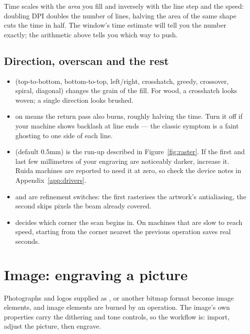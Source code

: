 \noindent Time scales with the \emph{area} you fill and inversely with the line
step and the speed: doubling DPI doubles the number of lines, halving the area of
the same shape cuts the time in half. The  window's time
estimate will tell you the number exactly; the arithmetic above tells you which
way to push.

\subsection*{Direction, overscan and the rest}

\begin{itemize}
  \item {} (top-to-bottom, bottom-to-top, left/right, crosshatch,
        greedy, crossover, spiral, diagonal) changes the grain of the fill. For
        wood, a crosshatch looks woven; a single direction looks brushed.
  \item {} on means the return pass also burns, roughly
        halving the time. Turn it off if your machine shows backlash at line ends
        --- the classic symptom is a faint ghosting to one side of each line.
  \item {} (default 0.5\unit{mm}) is the run-up described in
        Figure~\ref{fig:raster}. If the first and last few millimetres of your
        engraving are noticeably darker, increase it. Ruida machines are reported
        to need it at zero, so check the device notes in Appendix~\ref{app:drivers}.
  \item {} and  are refinement
        switches: the first rasterises the artwork's antialiasing, the second
        skips pixels the beam already covered.
  \item {} decides which corner the scan begins in. On
        machines that are slow to reach speed, starting from the corner nearest
        the previous operation saves real seconds.
\end{itemize}

\section{Image: engraving a picture}

Photographs and logos supplied as ,  or another bitmap
format become image elements, and image elements are burned by an
 operation. The image's own properties carry the dithering and
tone controls, so the workflow is: import, adjust the picture, then engrave.

